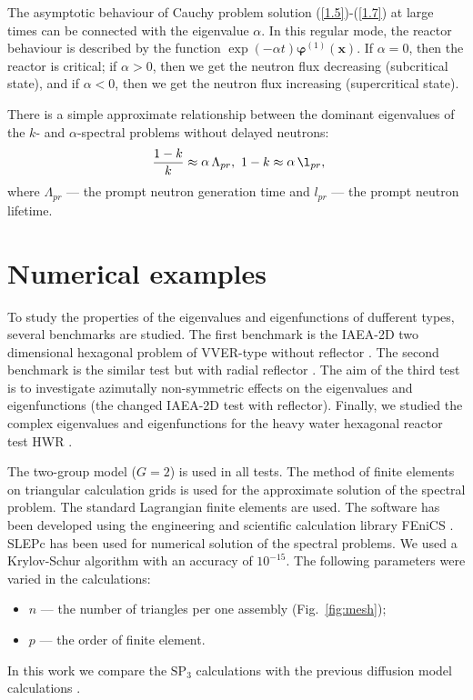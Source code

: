 \documentclass[authoryear]{elsarticle}
\begin{document}
The asymptotic behaviour of Cauchy problem solution (\ref{1.5})-(\ref{1.7}) at large times can be connected with the eigenvalue $\alpha$.
In this regular mode, the reactor behaviour is described by the function $\exp(-\alpha t) \bm \varphi^{(1)}(\bm x)$.
If $\alpha = 0$, then the reactor is critical; if $\alpha > 0$, then we get the neutron flux decreasing (subcritical state), and if $\alpha <  0$, then we get the neutron flux increasing (supercritical state).

There is a simple approximate relationship between the dominant eigenvalues of the $k$- and $\alpha$-spectral problems without delayed neutrons:
\begin{equation}\label{1.11}
\ \dfrac{1 - k}{k} \approx \mathop{\alpha} \Lambda_{pr},  
\ 1 - k \approx \mathop{\alpha} \l_{pr},
\end{equation}
where $\Lambda_{pr}$ ---  the prompt neutron generation time and  $l_{pr}$ ---  the prompt neutron lifetime.

\section{Numerical examples}
To study the properties of the eigenvalues and eigenfunctions of dufferent types, several benchmarks are studied.
The first benchmark is the IAEA-2D two dimensional hexagonal problem of VVER-type without reflector \citep{chao1995}.
The second benchmark is the similar test but with radial reflector \citep{chao1995}. 
The aim of the third test is to investigate azimutally non-symmetric effects on the eigenvalues and eigenfunctions 
(the changed IAEA-2D test with reflector).
Finally, we studied the complex eigenvalues and eigenfunctions for the heavy water hexagonal reactor test HWR \citep{chao1995}.

The two-group model ($G = 2$) is used in all tests. 
The method of finite elements \citep{brenner2008, quarteroni2008} on triangular calculation grids is used for the approximate solution of the spectral problem. 
The standard Lagrangian finite elements are used.
The software has been developed using the engineering and scientific calculation library FEniCS \citep{logg2012}.
SLEPc has been used for numerical solution of the spectral problems.
We used a Krylov-Schur algorithm with an accuracy of $10^{-15}$.
The following parameters were varied in the calculations:
\begin{itemize}\itemsep1pt \parskip0pt 
\item $n$ --- the number of triangles per one assembly (Fig.~\ref{fig:mesh}); 
\item $p$ --- the order of finite element.
\end{itemize}
In this work we compare the $\mathrm{SP_3}$ calculations with the previous diffusion model calculations \citep{avvakumov2014, avvakumov2017spectral}.
\end{document}
